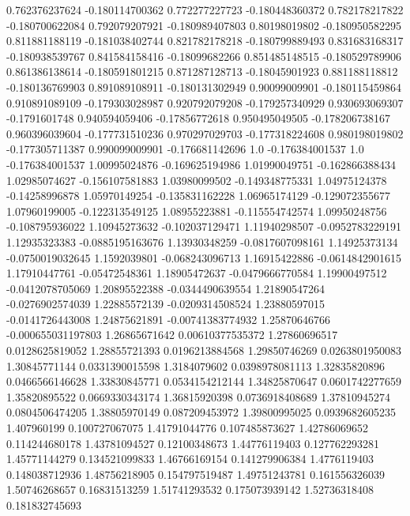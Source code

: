  0.762376237624  -0.180114700362
 0.772277227723  -0.180448360372
 0.782178217822  -0.180700622084
 0.792079207921  -0.180989407803
  0.80198019802  -0.180950582295
 0.811881188119  -0.181038402744
 0.821782178218  -0.180799889493
 0.831683168317  -0.180938539767
 0.841584158416   -0.18099682266
 0.851485148515  -0.180529789906
 0.861386138614  -0.180591801215
 0.871287128713   -0.18045901923
 0.881188118812  -0.180136769903
 0.891089108911  -0.180131302949
  0.90099009901  -0.180115459864
 0.910891089109  -0.179303028987
 0.920792079208  -0.179257340929
 0.930693069307    -0.1791601748
 0.940594059406   -0.17856772618
 0.950495049505  -0.178206738167
 0.960396039604  -0.177731510236
 0.970297029703  -0.177318224608
 0.980198019802  -0.177305711387
 0.990099009901  -0.176681142696
            1.0  -0.176384001537
            1.0  -0.176384001537
  1.00995024876  -0.169625194986
  1.01990049751  -0.162866388434
  1.02985074627  -0.156107581883
  1.03980099502  -0.149348775331
  1.04975124378   -0.14258996878
  1.05970149254  -0.135831162228
  1.06965174129  -0.129072355677
  1.07960199005  -0.122313549125
  1.08955223881  -0.115554742574
  1.09950248756  -0.108795936022
  1.10945273632  -0.102037129471
  1.11940298507  -0.0952783229191
  1.12935323383  -0.0885195163676
  1.13930348259  -0.0817607098161
  1.14925373134  -0.0750019032645
   1.1592039801  -0.068243096713
  1.16915422886  -0.0614842901615
  1.17910447761   -0.05472548361
  1.18905472637  -0.0479666770584
  1.19900497512  -0.0412078705069
  1.20895522388  -0.0344490639554
  1.21890547264  -0.0276902574039
  1.22885572139  -0.0209314508524
  1.23880597015  -0.0141726443008
  1.24875621891  -0.00741383774932
  1.25870646766  -0.000655031197803
  1.26865671642  0.00610377535372
  1.27860696517  0.0128625819052
  1.28855721393  0.0196213884568
  1.29850746269  0.0263801950083
  1.30845771144  0.0331390015598
   1.3184079602  0.0398978081113
  1.32835820896  0.0466566146628
  1.33830845771  0.0534154212144
  1.34825870647  0.0601742277659
  1.35820895522  0.0669330343174
  1.36815920398  0.0736918408689
  1.37810945274  0.0804506474205
  1.38805970149   0.087209453972
  1.39800995025  0.0939682605235
    1.407960199   0.100727067075
  1.41791044776   0.107485873627
  1.42786069652   0.114244680178
  1.43781094527    0.12100348673
  1.44776119403   0.127762293281
  1.45771144279   0.134521099833
  1.46766169154   0.141279906384
   1.4776119403   0.148038712936
  1.48756218905   0.154797519487
  1.49751243781   0.161556326039
  1.50746268657    0.16831513259
  1.51741293532   0.175073939142
  1.52736318408   0.181832745693

